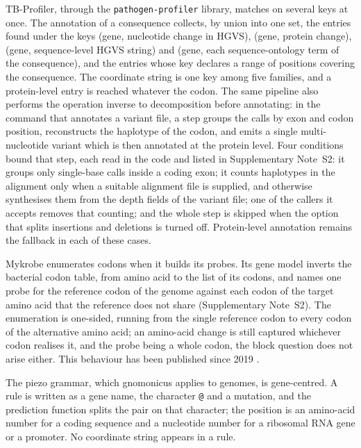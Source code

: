 \documentclass[11pt]{article}
\begin{document}
TB-Profiler, through the \texttt{pathogen-profiler} library, matches on several keys at
once. The annotation of a consequence collects, by union into one set, the entries found
under the keys (gene, nucleotide change in HGVS), (gene, protein change), (gene,
sequence-level HGVS string) and (gene, each sequence-ontology term of the consequence), and
the entries whose key declares a range of positions covering the consequence. The coordinate string is one key
among five families, and a protein-level entry is reached whatever the codon. The same
pipeline also performs the operation inverse to decomposition before annotating: in the
command that annotates a variant file, a step groups the calls by exon and codon position,
reconstructs the haplotype of the codon, and emits a single multi-nucleotide variant which is
then annotated at the protein level. Four conditions bound that step, each read in the code
and listed in Supplementary Note~S2: it groups only single-base calls inside a coding exon;
it counts haplotypes in the alignment only when a suitable alignment file is supplied, and
otherwise synthesises them from the depth fields of the variant file; one of the callers it
accepts removes that counting; and the whole step is skipped when the option that splits
insertions and deletions is turned off. Protein-level annotation remains the fallback in each
of these cases.

Mykrobe enumerates codons when it builds its probes. Its gene model inverts the bacterial
codon table, from amino acid to the list of its codons, and names one probe for the reference
codon of the genome against each codon of the target amino acid that the reference does not
share (Supplementary Note~S2). The enumeration is one-sided, running from the single reference
codon to every codon of the alternative amino acid; an amino-acid change is still captured
whichever codon realises it, and the probe being a whole codon, the block question does not
arise either. This behaviour has been published since 2019 \cite{hunt2019}.

The piezo grammar, which gnomonicus applies to genomes, is gene-centred. A rule is written
as a gene name, the character \texttt{@} and a mutation, and the prediction function splits
the pair on that character; the position is an amino-acid number for a coding sequence and
a nucleotide number for a ribosomal RNA gene or a promoter. No coordinate string appears in
a rule.
\end{document}
